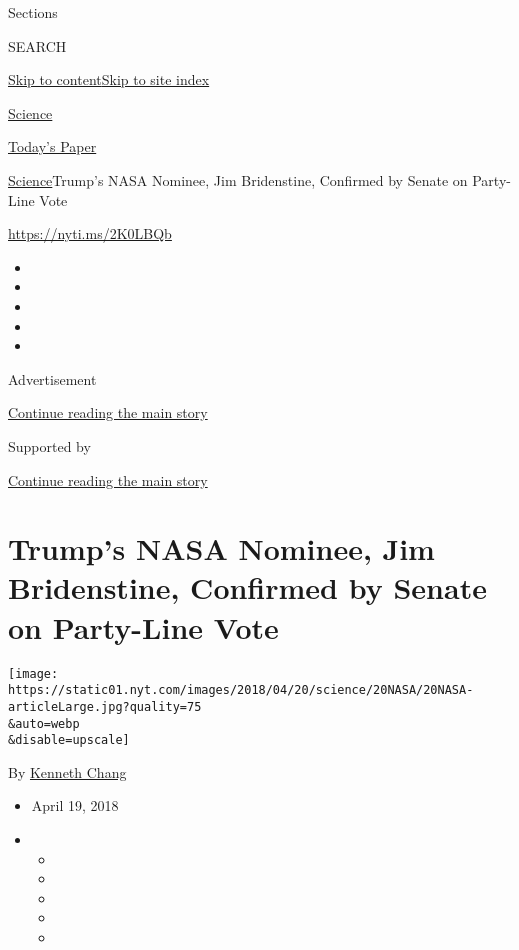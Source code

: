 Sections

SEARCH

\protect\hyperlink{site-content}{Skip to
content}\protect\hyperlink{site-index}{Skip to site index}

\href{https://www.nytimes.com/section/science}{Science}

\href{https://myaccount.nytimes.com/auth/login?response_type=cookie\&client_id=vi}{}

\href{https://www.nytimes.com/section/todayspaper}{Today's Paper}

\href{/section/science}{Science}\textbar{}Trump's NASA Nominee, Jim
Bridenstine, Confirmed by Senate on Party-Line Vote

\url{https://nyti.ms/2K0LBQb}

\begin{itemize}
\item
\item
\item
\item
\item
\end{itemize}

Advertisement

\protect\hyperlink{after-top}{Continue reading the main story}

Supported by

\protect\hyperlink{after-sponsor}{Continue reading the main story}

\hypertarget{trumps-nasa-nominee-jim-bridenstine-confirmed-by-senate-on-party-line-vote}{%
\section{Trump's NASA Nominee, Jim Bridenstine, Confirmed by Senate on
Party-Line
Vote}\label{trumps-nasa-nominee-jim-bridenstine-confirmed-by-senate-on-party-line-vote}}

\texttt{[image: https://static01.nyt.com/images/2018/04/20/science/20NASA/20NASA-articleLarge.jpg?quality=75\\\&auto=webp\\\&disable=upscale]}

By \href{http://www.nytimes.com/by/kenneth-chang}{Kenneth Chang}

\begin{itemize}
\item
  April 19, 2018
\item
  \begin{itemize}
  \item
  \item
  \item
  \item
  \item
  \end{itemize}
\end{itemize}

